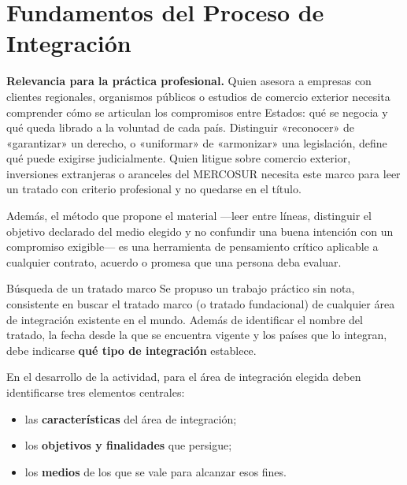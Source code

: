 \documentclass[12pt,oneside]{book}
\begin{document}
\tableofcontents
\mainmatter

\chapter[Fundamentos del proceso de integración]{Fundamentos del Proceso de Integración}

\begin{note}
\textbf{Relevancia para la práctica profesional.} Quien asesora a empresas con clientes regionales, organismos públicos o estudios de comercio exterior necesita comprender cómo se articulan los compromisos entre Estados: qué se negocia y qué queda librado a la voluntad de cada país. Distinguir «reconocer» de «garantizar» un derecho, o «uniformar» de «armonizar» una legislación, define qué puede exigirse judicialmente. Quien litigue sobre comercio exterior, inversiones extranjeras o aranceles del MERCOSUR necesita este marco para leer un tratado con criterio profesional y no quedarse en el título.

Además, el método que propone el material —leer entre líneas, distinguir el objetivo declarado del medio elegido y no confundir una buena intención con un compromiso exigible— es una herramienta de pensamiento crítico aplicable a cualquier contrato, acuerdo o promesa que una persona deba evaluar.
\end{note}

\begin{exercise}{Búsqueda de un tratado marco}
Se propuso un trabajo práctico sin nota, consistente en buscar el tratado marco (o tratado fundacional) de cualquier área de integración existente en el mundo. Además de identificar el nombre del tratado, la fecha desde la que se encuentra vigente y los países que lo integran, debe indicarse \textbf{qué tipo de integración} establece.

En el desarrollo de la actividad, para el área de integración elegida deben identificarse tres elementos centrales:
\begin{itemize}
    \item las \textbf{características} del área de integración;
    \item los \textbf{objetivos y finalidades} que persigue;
    \item los \textbf{medios} de los que se vale para alcanzar esos fines.
\end{itemize}
\end{exercise}
\end{document}
